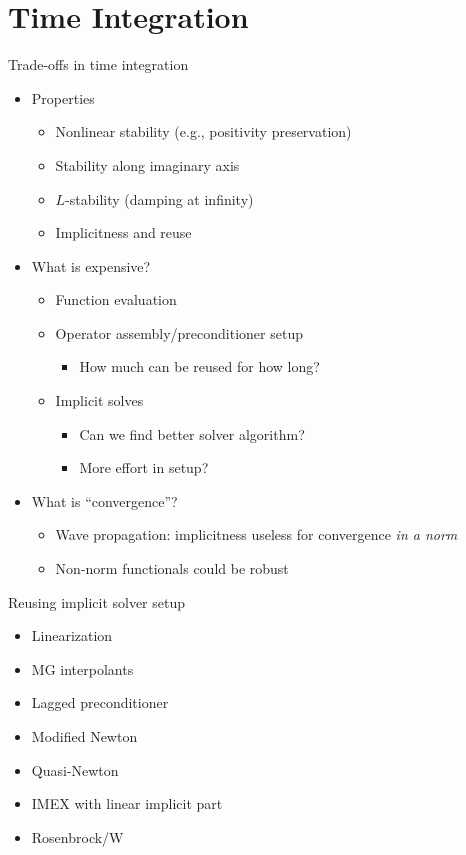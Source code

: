 \documentclass{beamer}
\begin{document}
\section{Time Integration}
\begin{frame}{Trade-offs in time integration}
  \begin{itemize}
  \item Properties
    \begin{itemize}
    \item Nonlinear stability (e.g., positivity preservation)
    \item Stability along imaginary axis
    \item $L$-stability (damping at infinity)
    \item Implicitness and reuse
    \end{itemize}
  \item What is expensive?
    \begin{itemize}
    \item Function evaluation
    \item Operator assembly/preconditioner setup
      \begin{itemize}
      \item How much can be reused for how long?
      \end{itemize}
    \item Implicit solves
      \begin{itemize}
      \item Can we find better solver algorithm?
      \item More effort in setup?
      \end{itemize}
    \end{itemize}
  \item What is ``convergence''?
    \begin{itemize}
    \item Wave propagation: implicitness useless for convergence \emph{in a norm}
    \item Non-norm functionals could be robust
    \end{itemize}
  \end{itemize}
\end{frame}

\begin{frame}{Reusing implicit solver setup}
  \begin{itemize}
  \item Linearization
  \item MG interpolants
  \item Lagged preconditioner
  \item Modified Newton
  \item Quasi-Newton
  \item IMEX with linear implicit part
  \item Rosenbrock/W
  \end{itemize}
\end{frame}
\end{document}
